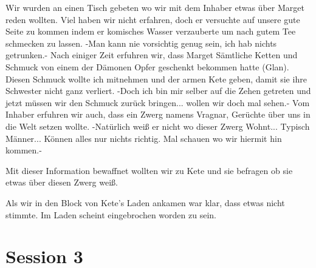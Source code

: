 \documentclass[10pt,twoside,openany]{book}
\begin{document}
	Wir wurden an einen Tisch gebeten wo wir mit dem Inhaber etwas über Marget reden wollten. Viel haben wir nicht erfahren, doch er versuchte auf unsere gute Seite zu kommen indem er komisches Wasser verzauberte um nach gutem Tee schmecken zu lassen. -Man kann nie vorsichtig genug sein, ich hab nichts getrunken.- Nach einiger Zeit erfuhren wir, dass Marget Sämtliche Ketten und Schmuck von einem der Dämonen Opfer geschenkt bekommen hatte (Glan). Diesen Schmuck wollte ich mitnehmen und der armen Kete geben, damit sie ihre Schwester nicht ganz verliert. -Doch ich bin mir selber auf die Zehen getreten und jetzt müssen wir den Schmuck zurück bringen... wollen wir doch mal sehen.- Vom Inhaber erfuhren wir auch, dass ein Zwerg namens Vragnar, Gerüchte über uns in die Welt setzen wollte. -Natürlich weiß er nicht wo dieser Zwerg Wohnt... Typisch Männer... Können alles nur nichts richtig. Mal schauen wo wir hiermit hin kommen.- 
	
	Mit dieser Information bewaffnet wollten wir zu Kete und sie befragen ob sie etwas über diesen Zwerg weiß. 
	
	Als wir in den Block von Kete's Laden ankamen war klar, dass etwas nicht stimmte. Im Laden scheint eingebrochen worden zu sein. 
	
	\chapter{Session 3}
	
\end{document}
